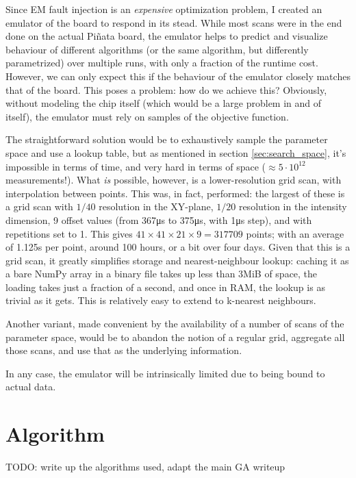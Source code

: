 \documentclass[times, utf8, diplomski]{fer}
\begin{document}
Since EM fault injection is an \emph{expensive} optimization problem, I created
an emulator of the board to respond in its stead. While most scans were in the
end done on the actual Piñata board, the emulator helps to predict and visualize
behaviour of different algorithms (or the same algorithm, but differently
parametrized) over multiple runs, with only a fraction of the runtime cost.
However, we can only expect this if the behaviour of the emulator closely
matches that of the board. This poses a problem: how do we achieve this?
Obviously, without modeling the chip itself (which would be a large problem
in and of itself), the emulator must rely on samples of the objective function.

The straightforward solution would be to exhaustively sample the parameter space
and use a lookup table, but as mentioned in section \ref{sec:search_space}, it's
impossible in terms of time, and very hard in terms of space ($\approx 5 \cdot
10^{12}$ measurements!). What \emph{is} possible, however, is a lower-resolution
grid scan, with interpolation between points. This was, in fact, performed: the
largest of these is a grid scan with $1/40$ resolution in the XY-plane, $1/20$
resolution in the intensity dimension, 9 offset values (from 367μs to 375μs,
with 1μs step), and with repetitions set to 1. This gives $41 \times 41 \times
21 \times 9 = 317709$ points; with an average of 1.125s per point, around 100
hours, or a bit over four days. Given that this is a grid scan, it greatly
simplifies storage and nearest-neighbour lookup: caching it as a bare NumPy
array in a binary file takes up less than 3MiB of space, the loading takes
just a fraction of a second, and once in RAM, the lookup is as trivial as it
gets. This is relatively easy to extend to k-nearest neighbours.

Another variant, made convenient by the availability of a number of scans of the
parameter space, would be to abandon the notion of a regular grid, aggregate all
those scans, and use that as the underlying information.


In any case, the emulator will be intrinsically limited due to being bound to
actual data.


\section{Algorithm}

TODO: write up the algorithms used, adapt the main GA writeup
\end{document}
